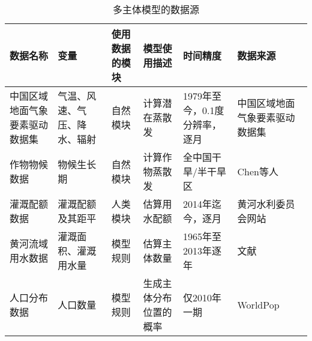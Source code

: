 \begin{table}[htbp]
    \centering
    \caption{多主体模型的数据源}
      \begin{tabularx}{\textwidth}{LLLLLL}
      \toprule
      数据名称  & 变量    & 使用数据的模块 & 模型使用描述 & 时间精度  & 数据来源 \\
      \midrule
      中国区域地面气象要素驱动数据集 & 气温、风速、气压、降水、辐射 & 自然模块  & 计算潜在蒸散发 & 1979年至今，0.1度分辨率，逐月 & 中国区域地面气象要素驱动数据集~\cite{data_yang} \\
      作物物候数据 & 物候生长期 & 自然模块  & 计算作物蒸散发 & 全中国干旱/半干旱区 & Chen等人~\cite{chen2023}\\
      灌溉配额数据 & 灌溉配额及其距平 & 人类模块  & 估算用水配额 & 2014年迄今，逐月 & 黄河水利委员会网站 \\
      黄河流域用水数据 & 灌溉面积、灌溉用水量 & 模型规则  & 估算主体数量 & 1965年至2013年逐年 & 文献\cite{zhou2020} \\
      人口分布数据 & 人口数量  & 模型规则  & 生成主体分布位置的概率 & 仅2010年一期 & WorldPop\cite{worldpop2020} \\
      \bottomrule
      \end{tabularx}%
    \label{ch6:tab:dataset}%
  \end{table}%
  